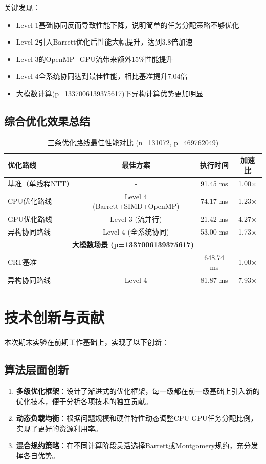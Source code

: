 \documentclass[a4paper]{article}
\begin{document}
	关键发现：
	\begin{itemize}
		\item Level 1基础协同反而导致性能下降，说明简单的任务分配策略不够优化
		\item Level 2引入Barrett优化后性能大幅提升，达到3.8倍加速
		\item Level 3的OpenMP+GPU流带来额外15\%性能提升
		\item Level 4全系统协同达到最佳性能，相比基准提升7.04倍
		\item 大模数计算(p=1337006139375617)下异构计算优势更加明显
	\end{itemize}
	\subsection{综合优化效果总结}
	\begin{table}[H]
		\centering
		\caption{三条优化路线最佳性能对比 (n=131072, p=469762049)}
		\begin{tabular}{|l|c|c|c|}
			\hline
			\textbf{优化路线} & \textbf{最佳方案} & \textbf{执行时间} & \textbf{加速比} \\
			\hline
			基准（单线程NTT） & - & 91.45 ms & 1.00× \\
			\hline
			CPU优化路线 & Level 4 (Barrett+SIMD+OpenMP) & 74.17 ms & 1.23× \\
			\hline
			GPU优化路线 & Level 3 (流并行) & 21.42 ms & 4.27× \\
			\hline
			异构协同路线 & Level 4 (全系统协同) & 53.00 ms & 1.73× \\
			\hline
			\multicolumn{4}{|c|}{\textbf{大模数场景 (p=1337006139375617)}} \\
			\hline
			CRT基准 & - & 648.74 ms & 1.00× \\
			\hline
			异构协同路线 & Level 4 & 81.87 ms & 7.93× \\
			\hline
		\end{tabular}
	\end{table}
	\section{技术创新与贡献}
	本次期末实验在前期工作基础上，实现了以下创新：
	\subsection{算法层面创新}
	\begin{enumerate}
		\item \textbf{多级优化框架}：设计了渐进式的优化框架，每一级都在前一级基础上引入新的优化技术，便于分析各项技术的独立贡献。
		\item \textbf{动态负载均衡}：根据问题规模和硬件特性动态调整CPU-GPU任务分配比例，实现了更好的资源利用率。
		
		\item \textbf{混合规约策略}：在不同计算阶段灵活选择Barrett或Montgomery规约，充分发挥各自优势。
	\end{enumerate}
\end{document}
